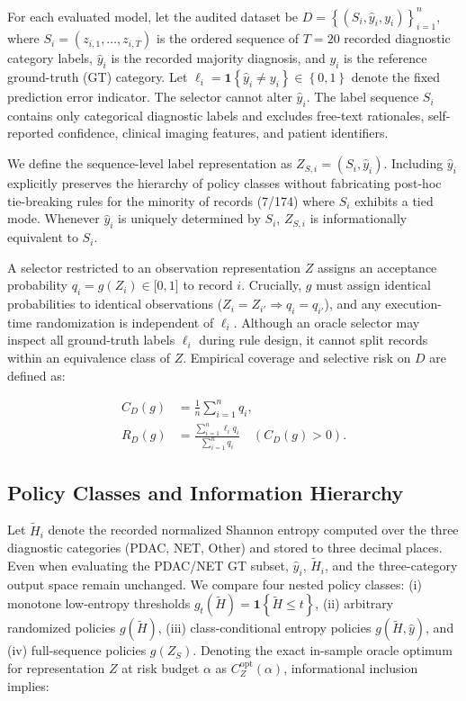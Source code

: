 \documentclass[letterpaper]{article}
\begin{document}
For each evaluated model, let the audited dataset be \(D = \left\{ \left( S_{i},{\widehat{y}}_{i},y_{i} \right) \right\}_{i = 1}^{n}\), where \(S_{i} = \left( z_{i,1},\ldots,z_{i,T} \right)\) is the ordered sequence of \(T = 20\) recorded diagnostic category labels, \({\widehat{y}}_{i}\) is the recorded majority diagnosis, and \(y_{i}\) is the reference ground-truth (GT) category. Let \(\ell_{i} = \mathbf{1}\left\{ {\widehat{y}}_{i} \neq y_{i} \right\} \in \left\{ 0,1 \right\}\) denote the fixed prediction error indicator. The selector cannot alter \({\widehat{y}}_{i}\). The label sequence \(S_{i}\) contains only categorical diagnostic labels and excludes free-text rationales, self-reported confidence, clinical imaging features, and patient identifiers.

We define the sequence-level label representation as \(Z_{S,i} = \left( S_{i},{\widehat{y}}_{i} \right)\). Including \({\widehat{y}}_{i}\) explicitly preserves the hierarchy of policy classes without fabricating post-hoc tie-breaking rules for the minority of records (7/174) where \(S_{i}\) exhibits a tied mode. Whenever \({\widehat{y}}_{i}\) is uniquely determined by \(S_{i}\), \(Z_{S,i}\) is informationally equivalent to \(S_{i}\).

A selector restricted to an observation representation \(Z\) assigns an acceptance probability \(q_{i} = g\left( Z_{i} \right) \in \lbrack 0,1\rbrack\) to record \(i\). Crucially, \(g\) must assign identical probabilities to identical observations (\(Z_{i} = Z_{i'} \Longrightarrow q_{i} = q_{i'}\)), and any execution-time randomization is independent of \(\ell_{i}\). Although an oracle selector may inspect all ground-truth labels \(\ell_{i}\) during rule design, it cannot split records within an equivalence class of \(Z\). Empirical coverage and selective risk on \(D\) are defined as:

\[\begin{aligned}
C_D(g) &= \frac{1}{n}\sum_{i=1}^n q_i,\\
R_D(g) &= \frac{\sum_{i=1}^n \ell_i q_i}{\sum_{i=1}^n q_i}
\quad (C_D(g)>0).
\end{aligned}\]

\subsection{Policy Classes and Information Hierarchy}

Let \({\widetilde{H}}_{i}\) denote the recorded normalized Shannon entropy computed over the three diagnostic categories (PDAC, NET, Other) and stored to three decimal places. Even when evaluating the PDAC/NET GT subset, \({\widehat{y}}_{i}\), \({\widetilde{H}}_{i}\), and the three-category output space remain unchanged. We compare four nested policy classes: (i) monotone low-entropy thresholds \(g_{t}\left( \widetilde{H} \right) = \mathbf{1}\left\{ \widetilde{H} \leq t \right\}\), (ii) arbitrary randomized policies \(g\left( \widetilde{H} \right)\), (iii) class-conditional entropy policies \(g\left( \widetilde{H},\widehat{y} \right)\), and (iv) full-sequence policies \(g\left( Z_{S} \right)\). Denoting the exact in-sample oracle optimum for representation \(Z\) at risk budget \(\alpha\) as \(C_{Z}^{\text{opt}}(\alpha)\), informational inclusion implies:
\end{document}
